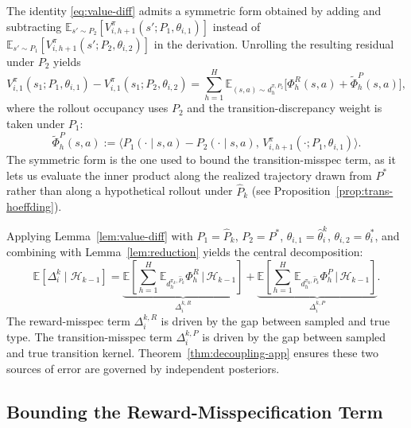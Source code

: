 \begin{remark}
\label{rem:value-diff-symmetric}
The identity \eqref{eq:value-diff} admits a symmetric form obtained by adding and subtracting $\mathbb{E}_{s' \sim P_2}[V_{i,h+1}^\pi(s'; P_1, \theta_{i,1})]$ instead of $\mathbb{E}_{s' \sim P_1}[V_{i,h+1}^\pi(s'; P_2, \theta_{i,2})]$ in the derivation. Unrolling the resulting residual under $P_2$ yields
\begin{equation}
\label{eq:value-diff-symmetric}
V_{i,1}^{\pi}(s_1; P_1, \theta_{i,1}) - V_{i,1}^{\pi}(s_1; P_2, \theta_{i,2}) = \sum_{h=1}^{H} \mathbb{E}_{(s,a) \sim d_h^{\pi, P_2}}\big[\Phi_h^R(s,a) + \tilde\Phi_h^P(s,a)\big],
\end{equation}
where the rollout occupancy uses $P_2$ and the transition-discrepancy weight is taken under $P_1$:
\begin{equation}
\tilde\Phi_h^P(s,a) := \big\langle P_1(\cdot \mid s, a) - P_2(\cdot \mid s, a),\, V_{i,h+1}^\pi(\cdot; P_1, \theta_{i,1})\big\rangle.
\end{equation}
The symmetric form is the one used to bound the transition-misspec term, as it lets us evaluate the inner product along the realized trajectory drawn from $P^*$ rather than along a hypothetical rollout under $\hat{P}_k$ (see Proposition~\ref{prop:trans-hoeffding}).
\end{remark}

Applying Lemma~\ref{lem:value-diff} with $P_1 = \hat{P}_k$, $P_2 = P^*$, $\theta_{i,1} = \hat{\theta}_i^k$, $\theta_{i,2} = \theta_i^*$, and combining with Lemma~\ref{lem:reduction} yields the central decomposition:
\begin{equation}
\label{eq:central-decomp}
\mathbb{E}[\Delta_i^k \mid \mathcal{H}_{k-1}] = \underbrace{\mathbb{E}\left[\sum_{h=1}^H \mathbb{E}_{d_h^{\pi_k, \hat{P}_k}}\Phi_h^R \,\Big|\, \mathcal{H}_{k-1}\right]}_{\Delta_i^{k,R}} + \underbrace{\mathbb{E}\left[\sum_{h=1}^H \mathbb{E}_{d_h^{\pi_k, \hat{P}_k}}\Phi_h^P \,\Big|\, \mathcal{H}_{k-1}\right]}_{\Delta_i^{k,P}}.
\end{equation}
The reward-misspec term $\Delta_i^{k,R}$ is driven by the gap between sampled and true type. The transition-misspec term $\Delta_i^{k,P}$ is driven by the gap between sampled and true transition kernel. Theorem~\ref{thm:decoupling-app} ensures these two sources of error are governed by independent posteriors.

\subsection{Bounding the Reward-Misspecification Term}

